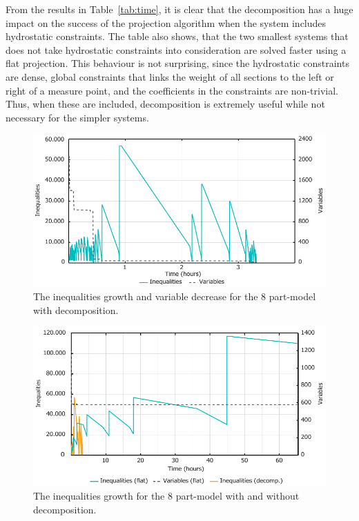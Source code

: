 From the results in Table~\ref{tab:time}, it is clear that the decomposition has a huge impact on the success of the projection algorithm when the system includes
hydrostatic constraints.
The table also shows, that the two smallest systems that does not take hydrostatic constraints into consideration are solved faster using a flat projection. This behaviour is not surprising, since the hydrostatic constraints are dense, global constraints that links the weight of all sections to the left or right of a measure point, and the coefficients in the constraints are non-trivial. Thus, when these are included, decomposition is extremely useful while not necessary for the simpler systems.
 
\begin{figure}[htbp]
	\centering
		\includegraphics[scale=0.7]{figures/decompIneqGrowth2.pdf}
	\caption{The inequalities growth and variable decrease for the 8 part-model with decomposition.}
	\label{fig:8parts}
\end{figure}

\begin{figure}[htbp]
	\centering
		\includegraphics[scale =0.7]{figures/ineqGrowth2.pdf}
	\caption{The inequalities growth for the 8 part-model with and without decomposition.}
	\label{fig:compare}
\end{figure}

